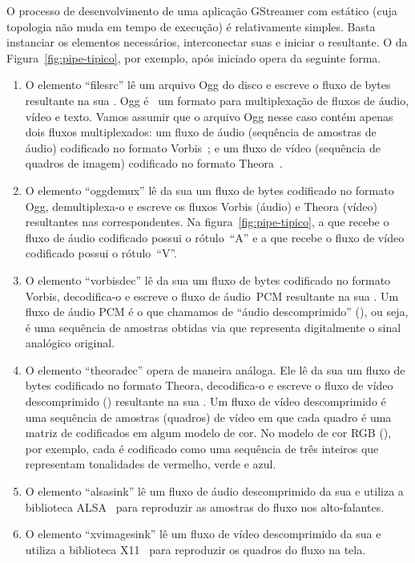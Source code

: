 \documentclass{SBCbookchapter}
\begin{document}
O processo de desenvolvimento de uma aplicação GStreamer com 
estático (cuja topologia não muda em tempo de execução) é relativamente
simples.  Basta instanciar os elementos necessários, interconectar suas
 e iniciar o  resultante.  O  da
Figura~\ref{fig:pipe-tipico}, por exemplo, após iniciado opera da seguinte
forma.
\begin{enumerate}
\item O elemento ``filesrc'' lê um arquivo Ogg do disco e escreve o fluxo de
  bytes resultante na sua .  Ogg é~\cite{ogg-rfc-3533} um
  formato para multiplexação de fluxos de áudio, vídeo e texto.  Vamos
  assumir que o arquivo Ogg nesse caso contém apenas dois fluxos
  multiplexados: um fluxo de áudio (sequência de amostras de áudio)
  codificado no formato Vorbis~\cite{vorbis}; e um fluxo de vídeo (sequência
  de quadros de imagem) codificado no formato Theora~\cite{theora}.
\item O elemento ``oggdemux'' lê da sua  um fluxo de bytes
  codificado no formato Ogg, demultiplexa-o e escreve os fluxos Vorbis
  (áudio) e Theora (vídeo) resultantes nas  correspondentes.
  Na figura~\ref{fig:pipe-tipico}, a  que recebe o fluxo
  de áudio codificado possui o rótulo~``A'' e a  que recebe o
  fluxo de vídeo codificado possui o rótulo~``V''.
\item O elemento ``vorbisdec'' lê da sua  um fluxo de bytes
  codificado no formato Vorbis, decodifica-o e escreve o fluxo de áudio~PCM
  resultante na sua .  Um fluxo de áudio PCM é o que chamamos
  de ``áudio descomprimido'' (), ou seja, é uma sequência de
  amostras obtidas via  que representa
  digitalmente o sinal analógico original.
\item O elemento ``theoradec'' opera de maneira análoga.  Ele lê da sua
   um fluxo de bytes codificado no formato Theora, decodifica-o
  e escreve o fluxo de vídeo descomprimido () resultante na sua
  .  Um fluxo de vídeo descomprimido é uma sequência de
  amostras (quadros) de vídeo em que cada quadro é uma matriz de 
  codificados em algum modelo de cor.  No modelo de cor RGB
  (), por exemplo, cada  é codificado como uma
  sequência de três inteiros que representam tonalidades de vermelho, verde
  e azul.
\item O elemento ``alsasink'' lê um fluxo de áudio descomprimido da sua
   e utiliza a biblioteca ALSA~\cite{alsa} para reproduzir as
  amostras do fluxo nos alto-falantes.
\item O elemento ``xvimagesink'' lê um fluxo de vídeo descomprimido da sua
   e utiliza a biblioteca X11~\cite{x11} para reproduzir os
  quadros do fluxo na tela.
\end{enumerate}
\end{document}
